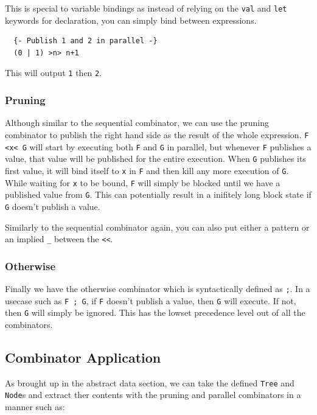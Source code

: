 \documentclass[12pt, letterpaper]{article}
\begin{document}
This is special to variable bindings as instead of relying on the \texttt{val} and \texttt{let} keywords for declaration, you can simply bind between expressions.

\begin{lstlisting}
  {- Publish 1 and 2 in parallel -}
  (0 | 1) >n> n+1
\end{lstlisting}
This will output \texttt{1} then \texttt{2}.
\subsubsection{Pruning}

Although similar to the sequential combinator, we can use the pruning combinator to publish the right hand side as the result of the whole expression.  \texttt{F <x< G} will start by executing both \texttt{F} and \texttt{G} in parallel, but whenever \texttt{F} publishes a value, that value will be published for the entire execution.  When \texttt{G} publishes its first value, it will bind itself to \texttt{x} in \texttt{F} and then kill any more execution of \texttt{G}.  While waiting for \texttt{x} to be bound, \texttt{F} will simply be blocked until we have a published value from \texttt{G}.  This can potentially result in a inifitely long block state if \texttt{G} doesn't publish a value\cite{UserGuide}.

Similarly to the sequential combinator again, you can also put either a pattern or an implied \texttt{\_} between the \texttt{<<}.

\subsubsection{Otherwise}

Finally we have the otherwise combinator which is syntactically defined as \texttt{;}.  In a usecase such as \texttt{F ; G}, if \texttt{F} doesn't publish a value, then \texttt{G} will execute.  If not, then \texttt{G} will simply be ignored.  This has the lowset precedence level out of all the combinators.

\subsection{Combinator Application }  %
As brought up in the abstract data section, we can take the defined \texttt{Tree} and \texttt{Node}s and extract ther contents with the pruning and parallel combinators in a manner such as:
\end{document}
